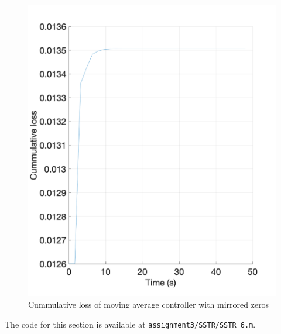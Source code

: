 \begin{figure}
	\centering
	\includegraphics[width=\textwidth]{images/sstr62.png}
	\caption{Cummulative loss of moving average controller with mirrored zeros}
	\label{fig:sstr62}
\end{figure}



\noindent The code for this section is available at \lstinline|assignment3/SSTR/SSTR_6.m|. 

